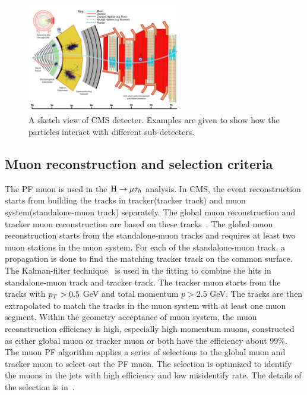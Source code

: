 \begin{figure}[htbp] 
\centering
\includegraphics[width=0.6\textwidth]{chapter4/CMS_detecter_slice.pdf}
\caption[A sketch view of CMS detecter. Examples are given to show how the particles interact with different sub-detecters.]{A sketch view of CMS detecter. Examples are given to show how the particles interact with different sub-detecters.}
\label{fig:CMSslice}
\end{figure}



\subsection{Muon reconstruction and selection criteria}

The PF muon is used in the $\mathrm{H}\to \mu\tau_{h}$ analysis. In CMS, the event reconstruction starts from building the tracks in tracker(tracker track) and muon system(standalone-muon track) separately. The global muon reconstruction and tracker muon reconstruction are based on these tracks~\cite{muonreco}. The global muon reconstruction starts from the standalone-muon tracks and requires at least two muon stations in the muon system. For each of the standalone-muon track, a propagation is done to find the matching tracker track on the common surface. The Kalman-filter technique~\cite{Fruhwirth:1987fm} is used in the fitting to combine the hits in standalone-muon track and tracker track. The tracker muon starts from the tracks with $p_{T}>0.5$ GeV and total momentum $p>2.5$ GeV. The tracks are then extrapolated to match the tracks in the muon system with at least one muon segment.  Within the geometry acceptance of muon system, the muon reconstruction efficiency is high, especially high momentum muons, constructed as either global muon or tracker muon or both have the  efficiency about 99\%. The muon PF algorithm applies a series of selections to the global muon and tracker muon to select out the PF muon. The selection is optimized to identify the muons in the jets with high efficiency and low misidentify rate. The details of the selection is in~\cite{PFmuonselection}.   




